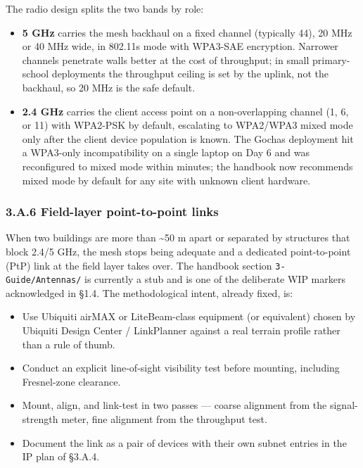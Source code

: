 The radio design splits the two bands by role:

\begin{itemize}
\tightlist
\item
  \textbf{5 GHz} carries the mesh backhaul on a fixed channel (typically
  44), 20 MHz or 40 MHz wide, in 802.11s mode with WPA3-SAE encryption.
  Narrower channels penetrate walls better at the cost of throughput; in
  small primary-school deployments the throughput ceiling is set by the
  uplink, not the backhaul, so 20 MHz is the safe default.
\item
  \textbf{2.4 GHz} carries the client access point on a non-overlapping
  channel (1, 6, or 11) with WPA2-PSK by default, escalating to
  WPA2/WPA3 mixed mode only after the client device population is known.
  The Gochas deployment hit a WPA3-only incompatibility on a single
  laptop on Day 6 and was reconfigured to mixed mode within minutes; the
  handbook now recommends mixed mode by default for any site with
  unknown client hardware.
\end{itemize}

\hypertarget{a.6-field-layer-point-to-point-links}{%
\subsubsection{3.A.6 Field-layer point-to-point
links}\label{a.6-field-layer-point-to-point-links}}

When two buildings are more than \textasciitilde50 m apart or separated
by structures that block 2.4/5 GHz, the mesh stops being adequate and a
dedicated point-to-point (PtP) link at the field layer takes over. The
handbook section \texttt{3-Guide/Antennas/} is currently a stub and is
one of the deliberate WIP markers acknowledged in §1.4. The
methodological intent, already fixed, is:

\begin{itemize}
\tightlist
\item
  Use Ubiquiti airMAX or LiteBeam-class equipment (or equivalent) chosen
  by Ubiquiti Design Center / LinkPlanner against a real terrain profile
  rather than a rule of thumb.
\item
  Conduct an explicit line-of-sight visibility test before mounting,
  including Fresnel-zone clearance.
\item
  Mount, align, and link-test in two passes --- coarse alignment from
  the signal-strength meter, fine alignment from the throughput test.
\item
  Document the link as a pair of devices with their own subnet entries
  in the IP plan of §3.A.4.
\end{itemize}


